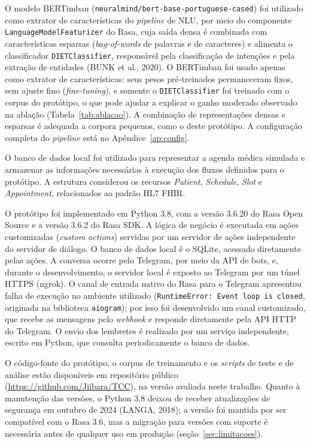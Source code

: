 \documentclass[12pt,a4paper]{extarticle}
\begin{document}
O modelo BERTimbau (\texttt{neuralmind/\allowbreak bert-base-\allowbreak portuguese-cased}) foi utilizado como extrator de características do \textit{pipeline} de NLU, por meio do componente \texttt{LanguageModel\allowbreak{}Featurizer} do Rasa, cuja saída densa é combinada com características esparsas (\textit{bag-of-words} de palavras e de caracteres) e alimenta o classificador \texttt{DIETClassifier}, responsável pela classificação de intenções e pela extração de entidades (BUNK et al., 2020). O BERTimbau foi usado apenas como extrator de características: seus pesos pré-treinados permaneceram fixos, sem ajuste fino (\textit{fine-tuning}), e somente o \texttt{DIETClassifier} foi treinado com o corpus do protótipo, o que pode ajudar a explicar o ganho moderado observado na ablação (Tabela~\ref{tab:ablacao}). A combinação de representações densas e esparsas é adequada a corpora pequenos, como o deste protótipo. A configuração completa do \textit{pipeline} está no Apêndice~\ref{ap:config}.

O banco de dados local foi utilizado para representar a agenda médica simulada e armazenar as informações necessárias à execução dos fluxos definidos para o protótipo. A estrutura considerou os recursos \textit{Patient}, \textit{Schedule}, \textit{Slot} e \textit{Appointment}, relacionados ao padrão HL7 FHIR.

O protótipo foi implementado em Python 3.8, com a versão 3.6.20 do Rasa Open Source e a versão 3.6.2 do Rasa SDK. A lógica de negócio é executada em ações customizadas (\textit{custom actions}) servidas por um servidor de ações independente do servidor de diálogo. O banco de dados local é o SQLite, acessado diretamente pelas ações. A conversa ocorre pelo Telegram, por meio da API de bots, e, durante o desenvolvimento, o servidor local é exposto ao Telegram por um túnel HTTPS (ngrok). O canal de entrada nativo do Rasa para o Telegram apresentou falha de execução no ambiente utilizado (\texttt{RuntimeError: Event loop is closed}, originada na biblioteca \texttt{aiogram}); por isso foi desenvolvido um canal customizado, que recebe as mensagens pelo \textit{webhook} e responde diretamente pela API HTTP do Telegram. O envio dos lembretes é realizado por um serviço independente, escrito em Python, que consulta periodicamente o banco de dados.

O código-fonte do protótipo, o corpus de treinamento e os \textit{scripts} de teste e de análise estão disponíveis em repositório público (\url{https://github.com/Jiibara/TCC}), na versão avaliada neste trabalho. Quanto à manutenção das versões, o Python 3.8 deixou de receber atualizações de segurança em outubro de 2024 (LANGA, 2018); a versão foi mantida por ser compatível com o Rasa 3.6, mas a migração para versões com suporte é necessária antes de qualquer uso em produção (seção~\ref{sec:limitacoes}).
\end{document}
